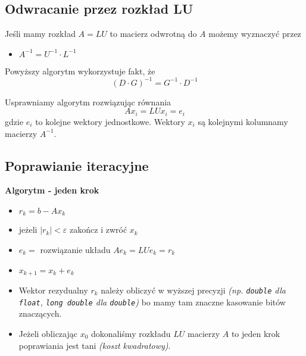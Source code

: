 \documentclass[../mn-notatki.tex]{subfiles}
\begin{document}
\subsection{Odwracanie przez rozkład LU}

\begin{tcolorbox}
Jeśli mamy rozkład $A = LU$ to macierz odwrotną do $A$ możemy wyznaczyć przez
\begin{itemize}
    \item $A^{-1} = U^{-1} \cdot L^{-1}$
\end{itemize}
Powyższy algorytm wykorzystuje fakt, że
\[
(D\cdot G)^{-1} = G^{-1} \cdot D^{-1}
\]
\end{tcolorbox}

Usprawniamy algorytm rozwiązując równania
\[
Ax_i = LUx_i = e_i
\]
gdzie $e_i$ to kolejne wektory jednostkowe. Wektory $x_i$ są kolejnymi
kolumnamy macierzy $A^{-1}$.

\subsection{Poprawianie iteracyjne}

\begin{tcolorbox}
\textbf{Algorytm - jeden krok}
\begin{itemize}
    \item $r_k = b - Ax_k$
    \item jeżeli $|r_k| < \varepsilon$ zakończ i zwróć $x_k$
    \item $e_k = $ rozwiązanie układu $Ae_k = LUe_k = r_k$
    \item $x_{k+1} = x_k + e_k$
\end{itemize}
\end{tcolorbox}

\begin{itemize}
    \item Wektor rezydualny $r_k$ należy obliczyć w wyższej precyzji
    \textit{(np. \texttt{double} dla \texttt{float}, \texttt{long double} dla
    \texttt{double})} bo mamy tam znaczne kasowanie bitów znaczących.
    \item Jeżeli obliczając $x_0$ dokonaliśmy rozkładu $LU$ macierzy $A$ to
    jeden krok poprawiania jest tani \textit{(koszt kwadratowy)}.
\end{itemize}


\end{document}
